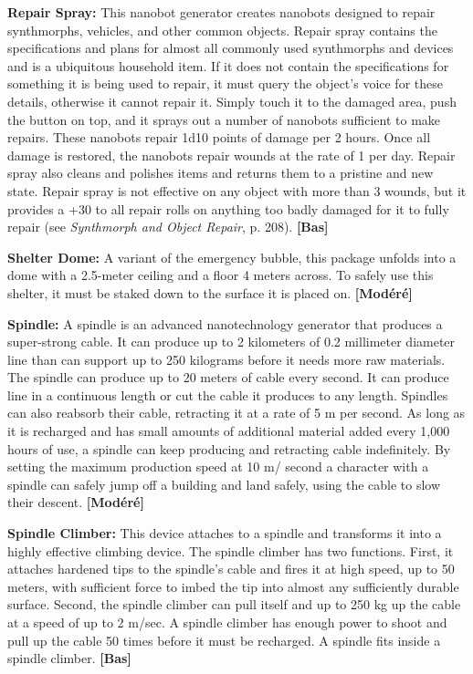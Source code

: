 {{\textbf{Repair Spray:} This nanobot generator creates nanobots designed to repair synthmorphs, vehicles, and other common objects. Repair spray contains the specifications and plans for almost all commonly used synthmorphs and devices and is a ubiquitous household item. If it does not contain the specifications for something it is being used to repair, it must query the object’s voice for these details, otherwise it cannot repair it. Simply touch it to the damaged area, push the button on top, and it sprays out a number of nanobots sufficient to make repairs. These nanobots repair 1d10 points of damage per 2 hours. Once all damage is restored, the nanobots repair wounds at the rate of 1 per day. Repair spray also cleans and polishes items and returns them to a pristine and new state. Repair spray is not effective on any object with more than 3 wounds, but it provides a +30 to all repair rolls on anything too badly damaged for it to fully repair (see \emph{Synthmorph and Object Repair}, p. 208). \textbf{[Bas]} 

\textbf{Shelter Dome:} A variant of the emergency bubble, this package unfolds into a dome with a 2.5-meter ceiling and a floor 4 meters across. To safely use this shelter, it must be staked down to the surface it is placed on. \textbf{[Modéré]} 

\textbf{Spindle:} A spindle is an advanced nanotechnology generator that produces a super-strong cable. It can produce up to 2 kilometers of 0.2 millimeter diameter line than can support up to 250 kilograms before it needs more raw materials. The spindle can produce up to 20 meters of cable every second. It can produce line in a continuous length or cut the cable it produces to any length. Spindles can also reabsorb their cable, retracting it at a rate of 5 m per second. As long as it is recharged and has small amounts of additional material added every 1,000 hours of use, a spindle can keep producing and retracting cable indefinitely. By setting the maximum production speed at 10 m/ second a character with a spindle can safely jump off a building and land safely, using the cable to slow their descent. \textbf{[Modéré]} 

\textbf{Spindle Climber:} This device attaches to a spindle and transforms it into a highly effective climbing device. The spindle climber has two functions. First, it attaches hardened tips to the spindle’s cable and fires it at high speed, up to 50 meters, with sufficient force to imbed the tip into almost any sufficiently durable surface. Second, the spindle climber can pull itself and up to 250 kg up the cable at a speed of up to 2 m/sec. A spindle climber has enough power to shoot and pull up the cable 50 times before it must be recharged. A spindle fits inside a spindle climber. \textbf{[Bas]} 

}}
